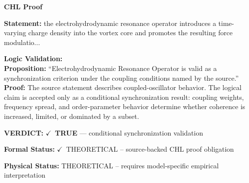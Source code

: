 \vspace{0.45em}
\noindent\textbf{CHL Proof}\par
\textbf{Statement:} the electrohydrodynamic resonance operator introduces a time-varying charge density into
the vortex core and promotes the resulting force modulatio...

\textbf{Logic Validation:}\\
\textbf{Proposition:} ``Electrohydrodynamic Resonance Operator is valid as a synchronization criterion under the
coupling conditions named by the source.''\\
\textbf{Proof:} The source statement describes coupled-oscillator behavior. The logical claim is
accepted only as a conditional synchronization result: coupling weights, frequency
spread, and order-parameter behavior determine whether coherence is increased, limited,
or dominated by a subset.

\textbf{VERDICT:} \ensuremath{\checkmark}\ \textbf{TRUE} --- conditional synchronization validation

\textbf{Formal Status:} \ensuremath{\checkmark}\ THEORETICAL -- source-backed CHL proof obligation

\textbf{Physical Status:} THEORETICAL -- requires model-specific empirical interpretation
\par\vspace{0.45em}
\par
\ifTZPDarkEdition
{}
\fi
\endgroup
\endgroup
